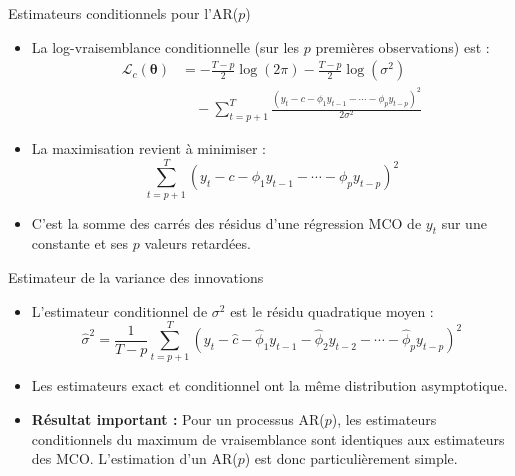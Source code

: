\documentclass[11pt,aspectratio=169]{beamer}
\begin{document}
\begin{frame}{Estimateurs conditionnels pour l'AR($p$)}

\begin{itemize}

\item La log-vraisemblance conditionnelle (sur les $p$ premières observations) est :
  \begin{align*}
  \mathcal{L}_c(\bm{\theta}) &= -\frac{T-p}{2}\log(2\pi) - \frac{T-p}{2}\log(\sigma^2) \\
  &\quad - \sum_{t=p+1}^{T} \frac{(y_t - c - \phi_1 y_{t-1} - \cdots - \phi_p y_{t-p})^2}{2\sigma^2}
  \end{align*}\newline

\item La maximisation revient à minimiser :
  \[
  \sum_{t=p+1}^{T} (y_t - c - \phi_1 y_{t-1} - \cdots - \phi_p y_{t-p})^2
  \]\newline

\item C'est la somme des carrés des résidus d'une régression MCO de $y_t$ sur une constante et ses $p$ valeurs retardées.

\end{itemize}

\end{frame}

\begin{frame}{Estimateur de la variance des innovations}

\begin{itemize}

\item L'estimateur conditionnel de $\sigma^2$ est le résidu quadratique moyen :
  \[
  \hat{\sigma}^2 = \frac{1}{T-p} \sum_{t=p+1}^{T} (y_t - \hat{c} - \hat{\phi}_1 y_{t-1} - \hat{\phi}_2 y_{t-2} - \cdots - \hat{\phi}_p y_{t-p})^2
  \]\newline

\item Les estimateurs exact et conditionnel ont la même distribution asymptotique.\newline

\item \textbf{Résultat important :} Pour un processus AR($p$), les estimateurs conditionnels du maximum de vraisemblance sont identiques aux estimateurs des MCO. L'estimation d'un AR($p$) est donc particulièrement simple.

\end{itemize}

\end{frame}
\end{document}
